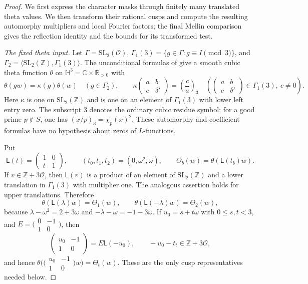 \documentclass[11pt,a4paper]{article}
\numberwithin{equation}{section}
\numberwithin{figure}{section}
\theoremstyle{definition}
\theoremstyle{remark}
\begin{document}
\begin{proof}
We first express the character masks through finitely many translated theta
values.  We then transform their rational cusps and compute the resulting
automorphy multipliers and local Fourier factors; the final Mellin comparison
gives the reflection identity and the bounds for its transformed test.

\emph{The fixed theta input.}
Let $\Gamma=\mathrm{SL}_2(\mathcal O)$,
$\Gamma_1(3)=\{g\in\Gamma:g\equiv I\pmod3\}$, and
$\Gamma_2=\langle\mathrm{SL}_2(\mathbb Z),\Gamma_1(3)\rangle$.
The unconditional formulas of
\cite[Equations (5.4), (5.7), (5.9), and (5.12)--(5.17)]{DR}
give a smooth cubic theta function $\theta$ on
$\mathbb H^3=\mathbb C\times\mathbb R_{>0}$ with
\[
 \theta(gw)=\kappa(g)\theta(w)\quad(g\in\Gamma_2),\qquad
 \kappa\!\begin{pmatrix}a&b\\c&\delta'\end{pmatrix}
   =\left(\frac ca\right)_3\quad
   \left(\begin{pmatrix}a&b\\c&\delta'\end{pmatrix}\in\Gamma_1(3),\ c\ne0\right).
\]
Here $\kappa$ is one on $\mathrm{SL}_2(\mathbb Z)$ and is one on an
element of $\Gamma_1(3)$ with lower left entry zero.  The subscript $3$
denotes the ordinary cubic residue symbol; for a good prime $p\notin S$,
one has $(x/p)_3=\chi_p(x)^2$.
These automorphy and coefficient formulas have no hypothesis about zeros
of $L$-functions.

Put
\[
 \mathsf L(t)=\begin{pmatrix}1&0\\t&1\end{pmatrix},\qquad
 (t_0,t_1,t_2)=(0,\omega^2,\omega),\qquad
 \Theta_b(w)=\theta(\mathsf L(t_b)w).
\]
If $v\in\mathbb Z+3\mathcal O$, then $\mathsf L(v)$ is a product of
an element of $\mathrm{SL}_2(\mathbb Z)$ and a lower translation in
$\Gamma_1(3)$ with multiplier one.  The analogous assertion
holds for upper translations.  Therefore
\[
 \theta(\mathsf L(\lambda)w)=\Theta_1(w),\qquad
 \theta(\mathsf L(-\lambda)w)=\Theta_2(w),
\]
because $\lambda-\omega^2=2+3\omega$ and
$-\lambda-\omega=-1-3\omega$.  If $u_0=s+t\omega$ with
$0\le s,t<3$, and $E=\bigl(\begin{smallmatrix}0&-1\\1&0\end{smallmatrix}\bigr)$,
then
\[
 \begin{pmatrix}u_0&-1\\1&0\end{pmatrix}=E\mathsf L(-u_0),
 \qquad -u_0-t_t\in\mathbb Z+3\mathcal O,
\]
and hence $\theta\bigl(\bigl(\begin{smallmatrix}u_0&-1\\1&0\end{smallmatrix}\bigr)w\bigr)
=\Theta_t(w)$.  These are the only cusp representatives needed below.


\end{proof}
\end{document}
